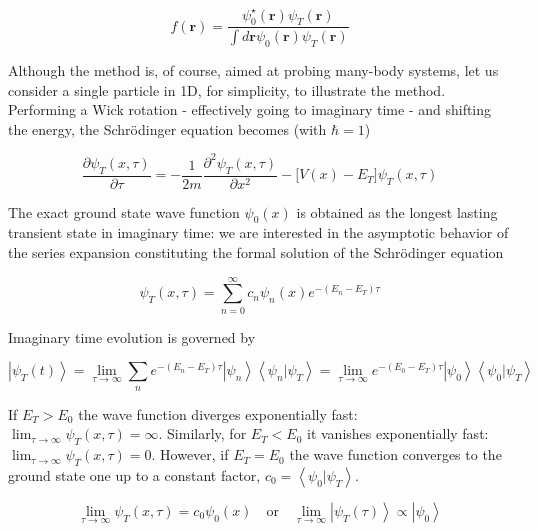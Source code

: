 \begin{equation}
f(\bm r) = \frac{\psi_0^\star (\bm r) \psi_T (\bm r) }{ \int d\bm r  \psi_0 (\bm r) \psi_T (\bm r)}
\end{equation}

Although the method is, of course, aimed at probing many-body systems, let us consider a single particle in \acs{1D}, for simplicity, to illustrate the method.
Performing a Wick rotation - effectively going to imaginary time - and shifting the energy, the Schr\"odinger equation becomes (with $\hbar = 1$)

\begin{equation}
\frac{\partial \psi_T ( x, \tau )}{\partial\tau}  = -\frac{1}{2m}\frac{\partial^2 \psi_T ( x, \tau )}{\partial x^2} - \bigg[ V(x) - E_T \bigg] \psi_T( x, \tau ) 
\end{equation}

The exact ground state wave function $\psi_0 ( x )$ is obtained as the longest lasting transient state in imaginary time: we are interested in the asymptotic behavior of the series expansion constituting the formal solution of the Schr\"odinger equation

\begin{equation}
\psi_T (x, \tau) = \sum_{n=0}^{\infty} c_n \psi_n (x) e^{-(E_n - E_T)\tau}
\end{equation}

Imaginary time evolution is governed by

\begin{equation}\label{eq:im_ev}
\left| \psi_T (t) \right\rangle = \lim_{\tau \rightarrow \infty} \sum_n e^{-(E_n - E_T) \tau} \left|\psi_n \right\rangle \left\langle \psi_n | \psi_T \right\rangle = \lim_{\tau \rightarrow \infty} e^{-(E_0 - E_T)\tau} \left| \psi_0 \right\rangle \left\langle \psi_0 | \psi_T \right\rangle 
\end{equation}


If $E_T > E_0$ the wave function diverges exponentially fast: $\lim_{\tau \rightarrow \infty} \psi_T ( x, \tau) = \infty$.
Similarly, for $E_T < E_0$ it vanishes exponentially fast: $\lim_{\tau \rightarrow \infty} \psi_T ( x, \tau) = 0$.
However, if $E_T = E_0$ the wave function converges to the ground state one up to a constant factor, $c_0 = \left\langle \psi_0 | \psi_T \right\rangle$.

\begin{equation}\label{eq:dmc}
\lim_{\tau \rightarrow \infty} \psi_T ( x, \tau) = c_0 \psi_0 (x) \quad \text{or} \quad \lim_{\tau \rightarrow \infty} \left|\psi_T (\tau) \right\rangle \propto \left| \psi_0 \right\rangle
\end{equation}

